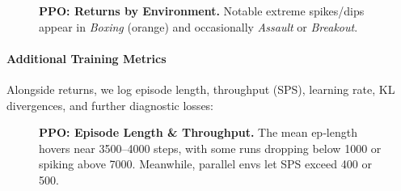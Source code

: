 \begin{figure}[htbp]
	\centering
	\quad
	\caption{\textbf{PPO: Returns by Environment.} 
		Notable extreme spikes/dips appear in \emph{Boxing} (orange) 
		and occasionally \emph{Assault} or \emph{Breakout}.}
	\label{fig:ppo_returns_pergame}
\end{figure}

\paragraph{Additional Training Metrics}
Alongside returns, we log episode length, throughput (SPS), learning rate, KL divergences, and further diagnostic losses:

\begin{figure}[htbp]
	\centering
	\quad
	\caption{\textbf{PPO: Episode Length \& Throughput.}
		The mean ep‐length hovers near 3500--4000 steps, 
		with some runs dropping below 1000 or spiking above 7000. 
		Meanwhile, parallel envs let SPS exceed 400 or 500.}
	\label{fig:ppo_epilen_sps}
\end{figure}

